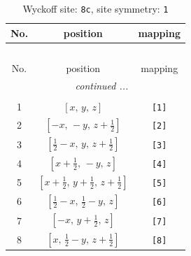 \documentclass[fleqn,8pt]{jsarticle}
\begin{document}
\renewcommand{\arraystretch}{1.2}
\begin{longtable}{ccc}
\caption{Wyckoff site: {\tt 8c}, site symmetry: {\tt 1}}
 \\
 \hline \hline
No. & position & mapping \\ \hline \endfirsthead

\multicolumn{2}{l}{\tablename\ \thetable{}} \\
 \hline \hline
No. & position & mapping \\ \hline \endhead

 \hline \hline
\multicolumn{2}{r}{\footnotesize\it continued ...} \\ \endfoot

 \hline \hline
\multicolumn{2}{r}{} \\ \endlastfoot

1 & $\left[ x,\, y,\, z \right]$ & {\tt [1]} \\ \hline
2 & $\left[ - x,\, - y,\, z + \frac{1}{2} \right]$ & {\tt [2]} \\ \hline
3 & $\left[ \frac{1}{2} - x,\, y,\, z + \frac{1}{2} \right]$ & {\tt [3]} \\ \hline
4 & $\left[ x + \frac{1}{2},\, - y,\, z \right]$ & {\tt [4]} \\ \hline
5 & $\left[ x + \frac{1}{2},\, y + \frac{1}{2},\, z + \frac{1}{2} \right]$ & {\tt [5]} \\ \hline
6 & $\left[ \frac{1}{2} - x,\, \frac{1}{2} - y,\, z \right]$ & {\tt [6]} \\ \hline
7 & $\left[ - x,\, y + \frac{1}{2},\, z \right]$ & {\tt [7]} \\ \hline
8 & $\left[ x,\, \frac{1}{2} - y,\, z + \frac{1}{2} \right]$ & {\tt [8]} \\
\end{longtable}
\end{document}
